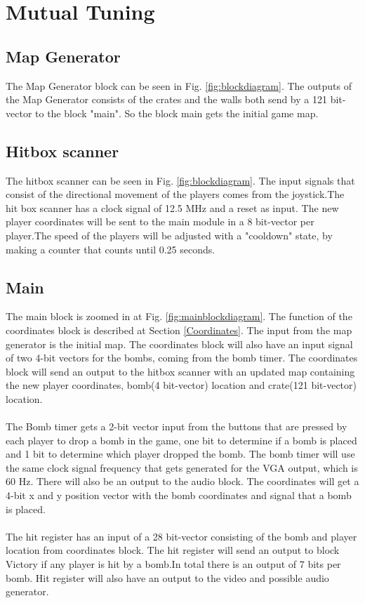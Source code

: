 \section{Mutual Tuning}
\subsection{Map Generator}
The Map Generator block can be seen in Fig. \ref{fig:blockdiagram}. The outputs of the Map Generator consists of the crates and the walls both send by a 121 bit-vector to the block "main". So the block main gets the initial game map. 

\subsection{Hitbox scanner}
The hitbox scanner can be seen in Fig. \ref{fig:blockdiagram}. The input signals that consist of the directional movement of the players comes from the joystick.The hit box scanner has a clock signal of 12.5 MHz and a reset as input. The new player coordinates will be sent to the main module in a 8 bit-vector per player.The speed of the players will be adjusted with a "cooldown" state, by making a counter that counts until 0.25 seconds.  

\subsection{Main}
The main block is zoomed in at Fig. \ref{fig:mainblockdiagram}. The function of the coordinates block is described at Section \ref{Coordinates}. The input from the map generator is the initial map. The coordinates block will also have an input signal of two 4-bit vectors for the bombs, coming from the bomb timer. The coordinates block will send an output to the hitbox scanner with an updated map containing the new player coordinates, bomb(4 bit-vector) location and crate(121 bit-vector) location.
\\
\\
\noindent
The Bomb timer gets a 2-bit vector input from the buttons that are pressed by each player to drop a bomb in the game, one bit to determine if a bomb is placed and 1 bit to determine which player dropped the bomb. The bomb timer will use the same clock signal frequency that gets generated for the VGA output, which is 60 Hz. There will also be an output to the audio block. The coordinates will get a 4-bit x and y position vector with the bomb coordinates and signal that a bomb is placed. 
\\
\\
\noindent
The hit register has an input of a 28 bit-vector consisting of the bomb and player location from coordinates block. The hit register will send an output to block Victory if any player is hit by a bomb.In total there is an output of 7 bits per bomb. Hit register will also have an output to the video and possible audio generator.

